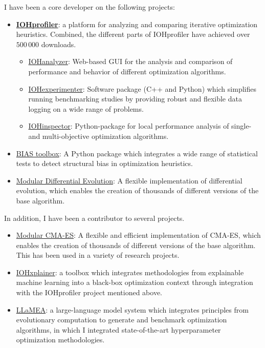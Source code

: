 I have been a core developer on the following projects: 
\begin{itemize}
    \item[] \href{https://github.com/IOHprofiler}{\textbf{IOHprofiler}}: a platform for analyzing and comparing iterative optimization heuristics. Combined, the different parts of IOHprofiler have achieved over $500\,000$ downloads. 
    \begin{itemize}
        \item \href{https://iohanalyzer.liacs.nl/}{IOHanalyzer}: Web-based GUI for the analysis and comparison of performance and behavior of different optimization algorithms.
        \item  \href{https://iohprofiler.github.io/IOHexperimenter/}{IOHexperimenter}: Software package (C++ and Python) which simplifies running benchmarking studies by providing robust and flexible data logging on a wide range of problems.
        \item \href{https://iohprofiler.github.io/IOHinspector/}{IOHinspector}: Python-package for local performance analysis of single- and multi-objective optimization algorithms. 
    \end{itemize}
    \item[] \href{https://github.com/nikivanstein/BIAS}{BIAS toolbox}: A Python package which integrates a wide range of statistical tests to detect structural bias in optimization heuristics.
    \item[] \href{https://github.com/Dvermetten/ModDE}{Modular Differential Evolution}: A flexible implementation of differential evolution, which enables the creation of thousands of different versions of the base algorithm. 
\end{itemize}

In addition, I have been a contributor to several projects.
\begin{itemize}
    \item[]\href{https://github.com/IOHprofiler/ModularCMAES}{Modular CMA-ES}: A flexible and efficient implementation of CMA-ES, which enables the creation of thousands of different versions of the base algorithm. This has been used in a variety of research projects. \\
    \item[]\href{https://github.com/nikivanstein/IOHxplainer}{IOHxplainer}: a toolbox which integrates methodologies from explainable machine learning into a black-box optimization context through integration with the IOHprofiler project mentioned above.\\
    \item[]\href{https://github.com/XAI-liacs/LLaMEA}{LLaMEA}: a large-language model system which integrates principles from evolutionary computation to generate and benchmark optimization algorithms, in which I integrated state-of-the-art hyperparameter optimization methodologies. 
\end{itemize}